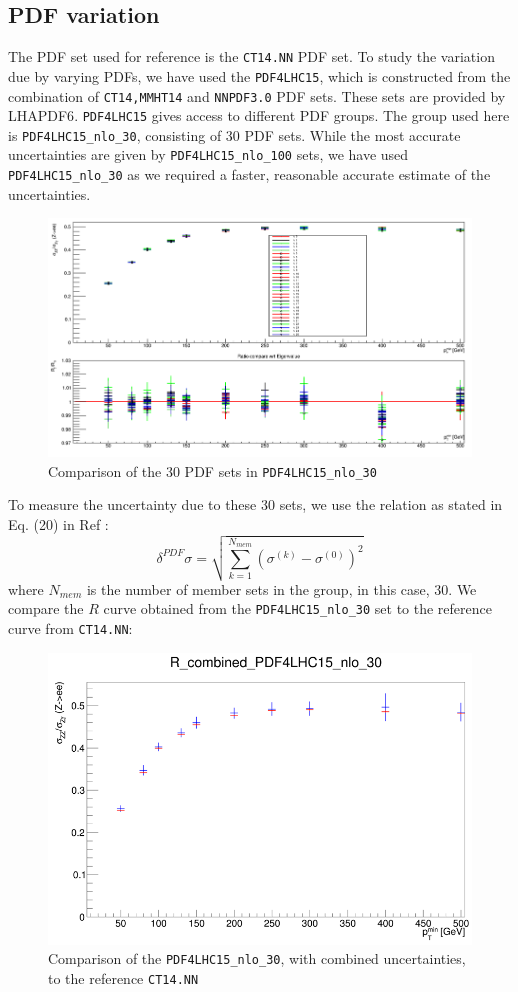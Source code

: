 \documentclass[11pt,a4paper,final]{report}
\begin{document}
\subsection{PDF variation}
The PDF set used for reference is the \texttt{CT14.NN} PDF set. To study the variation due by varying PDFs, we have used the \texttt{PDF4LHC15}\cite{PDF4}, which is constructed from the combination of \texttt{CT14,MMHT14} and \texttt{NNPDF3.0} PDF sets. These sets are provided by LHAPDF6\cite{LHAPDF}. \texttt{PDF4LHC15} gives access to different PDF groups. The group used here is \texttt{PDF4LHC15\_nlo\_30}, consisting of 30 PDF sets. While the most accurate uncertainties are given by \texttt{PDF4LHC15\_nlo\_100} sets, we have used \texttt{PDF4LHC15\_nlo\_30} as we required a faster, reasonable accurate estimate of the uncertainties.
\begin{figure}[H]
\centering
	\includegraphics[width = 0.7\linewidth]{PDF4_30_overlay.png}
	\caption{Comparison of the 30 PDF sets in \texttt{PDF4LHC15\_nlo\_30}}
\end{figure}
To measure the uncertainty due to these 30 sets, we use the relation as stated in Eq. (20) in Ref \cite{PDF4}:
\begin{equation}
	\delta^{PDF}\sigma = \sqrt{\sum^{N_{mem}}_{k=1} (\sigma^{(k)} - \sigma^{(0)})^2}
\end{equation}
where $N_{mem}$ is the number of member sets in the group, in this case, 30. We compare the $R$ curve obtained from the \texttt{PDF4LHC15\_nlo\_30} set to the reference curve from \texttt{CT14.NN}:
\begin{figure}[H]
\centering
	\includegraphics[width = 0.6\linewidth]{PDF4_CT14_comp.png}
	\caption{Comparison of the \texttt{PDF4LHC15\_nlo\_30}, with combined uncertainties, to the reference \texttt{CT14.NN}}
\end{figure}
\end{document}

